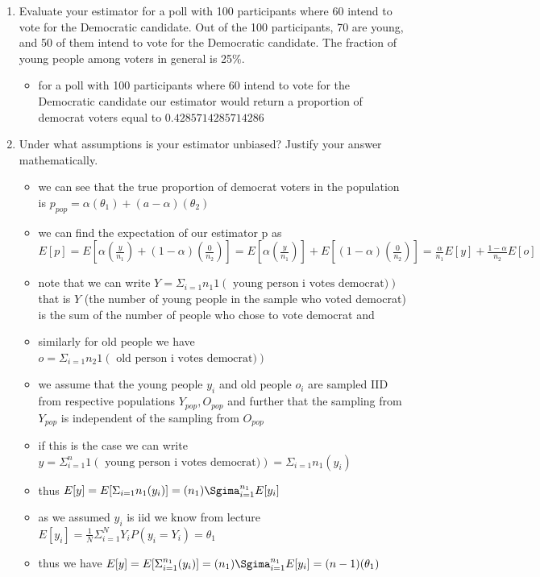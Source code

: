 \documentclass[12pt,twoside]{article}
\begin{document}
\begin{enumerate}
\begin{enumerate}
\begin{itemize}
\end{itemize}
\item Evaluate your estimator for a poll with 100 participants where 60 intend to vote for the Democratic candidate. Out of the 100 participants, 70 are young, and 50 of them intend to vote for the Democratic candidate. The fraction of young people among voters in general is 25\%. 
\begin{itemize}
    \item for a poll with 100 participants where 60 intend to vote for the Democratic candidate our estimator would return a proportion of democrat voters equal to $0.4285714285714286$
\end{itemize}


\item Under what assumptions is your estimator unbiased? Justify your answer mathematically.
\begin{itemize}
    \item we can see that the true proportion of democrat voters in the population is $p_{pop}=\alpha(\theta_1)+(a-\alpha)(\theta_2)$
    \item we can find the expectation of our estimator p as $E[p]=E[\alpha(\frac{y}{n_1})+(1-\alpha)(\frac{0}{n_2})]=E[\alpha(\frac{y}{n_1})]+E[(1-\alpha)(\frac{0}{n_2})]=\frac{\alpha}{n_1}E[y]+\frac{1-\alpha}{n_2}E[o]$
    \item note that we can write $Y=\Sigma_{i=1}{n_1}1(\text{ young person i votes democrat)})$ that is $Y$ (the number of young people in the sample who voted democrat) is the sum of the number of people who chose to vote democrat and
    \item similarly for old people we have $o=\Sigma_{i=1}{n_2}1(\text{ old person i votes democrat)})$
    \item we assume that the young people $y_i$ and old people $o_i$ are sampled IID from respective populations $Y_{pop}, O_{pop}$ and further that the sampling from $Y_{pop}$ is independent of the sampling from $O_{pop}$
    \item if this is the case we can write $y=\Sigma_{i=1}^{n}1(\text{ young person i votes democrat)})=\Sigma_{i=1}{n_1}(y_i)$
    \item thus $E[y]=E[\Sigma_{i=1}{n_1}(y_i)]=(n_1)\Sgima_{i=1}^{n_1}E[y_i]$
    \item as we assumed $y_i$ is iid we know from lecture $E[y_i]=\frac{1}{N}\Sigma_{i=1}^{N}Y_iP(y_i=Y_i)=\theta_1$
    \item thus we have $E[y]=E[\Sigma_{i=1}^{n_1}(y_i)]=(n_1)\Sgima_{i=1}^{n_1}E[y_i]=(n-1)(\theta_1)$

\end{itemize}
\end{enumerate}
\end{enumerate}
\end{document}

